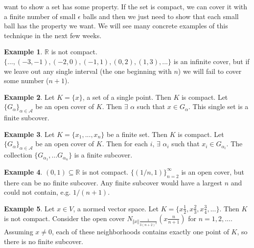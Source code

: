 \documentclass[12pt,reqno]{amsart}
\theoremstyle{definition}
\newtheorem{example}{Example}[section]
\def\R{\mathbb{R}}
\newcommand{\norm}[1]{\left\Vert {#1} \right\Vert}
\begin{document}
want to show a set has some property. If the set is compact, we can
cover it with a finite number of small $\epsilon$ balls and then we
just need to show that each small ball has the property we want. We
will see many concrete examples of this technique in the next few
weeks.
\begin{example}
  $\R$ is not compact. $\{..., (-3, -1), (-2, 0),(-1,1), (0,2), (1,3),
  ... \}$ is an infinite cover, but if we leave out any single
  interval (the one beginning with $n$) we will fail to cover
  some number ($n+1$).
\end{example}
\begin{example}
  Let $K = \{x\}$, a set of a single point. Then $K$ is compact. Let
  $\{G_\alpha\}_{\alpha \in \mathcal{A}}$ be an open cover of
  $K$. Then $\exists$ $\alpha$ such that $x \in G_\alpha$. This single
  set is a finite subcover.
\end{example}
\begin{example}
  Let $K = \{x_1, ..., x_n\}$ be a finite set. Then $K$ is
  compact.  Let
  $\{G_\alpha\}_{\alpha \in \mathcal{A}}$ be an open cover of
  $K$. Then for each $i$, $\exists$ $\alpha_i$ such that $x_i \in
  G_{\alpha_i}$. 
  The collection $\{G_{\alpha_1}, ... G_{\alpha_n} \}$ is a finite
  subcover.
\end{example}
\begin{example}
  $(0,1) \subseteq \R$ is not compact. $\{(1/n,1)\}_{n=2}^\infty$ is
  an open cover, but there can be no finite subcover. Any finite
  subcover would have a largest $n$ and could not contain,
  e.g. $1/(n+1)$. 
\end{example}
\begin{example}
  Let $x \in V$, a normed vector space. Let $K = \{x\frac{1}{2},
  x\frac{2}{3}, x\frac{3}{4}, ... \}$. Then $K$ is not
  compact. Consider the open cover $N_{\norm{x}\frac{1}{3(n+2)^2}}(x
  \frac{n}{n+1})$ for $n=1,2, ...$. Assuming $x \neq 0$, each of these
  neighborhoods contains exactly one point of $K$, so there is no
  finite subcover. 
\end{example}
\end{document}
